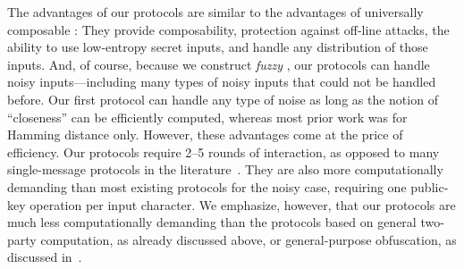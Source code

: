 The advantages of our protocols are similar to the advantages of universally composable \PAKE:
They provide composability, protection against off-line attacks, the ability to use low-entropy secret inputs, and handle any distribution of those inputs. 
And, of course, because we construct \emph{fuzzy} \PAKE, our protocols can handle noisy inputs---including many types of noisy inputs that could not be handled before. 
Our first protocol can handle any type of noise as long as the notion of ``closeness'' can be efficiently computed,
whereas most prior work was for Hamming distance only.
However, these advantages come at the price of efficiency.
Our protocols require 2--5 rounds of interaction, as opposed to many single-message protocols in the literature~\cite{DKKRS12,EC:CFPRS16,WCDJR17}.
They are also more computationally demanding than most existing protocols for the noisy case, requiring one public-key operation per input character. %
We emphasize, however, that our protocols are much less computationally demanding than the protocols based on general two-party computation, as already discussed above, or general-purpose obfuscation, as discussed in~\cite[Section 4.3.4]{C:BCKP14}.



